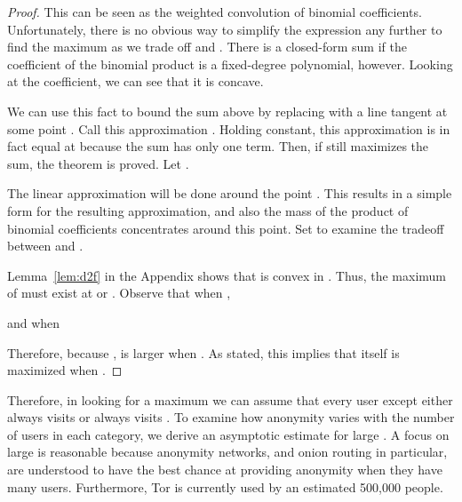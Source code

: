 \documentclass[prodmode,acmtissec]{acmsmall}
\begin{document}
\begin{proof}
This can be seen as the weighted convolution of binomial coefficients.  Unfortunately, there is no obvious way to simplify the expression any further to find the maximum as we trade off  and .  There is a closed-form sum if the coefficient of the binomial product is a fixed-degree polynomial, however.  Looking at the coefficient, we can see that it is concave.


We can use this fact to bound the sum above by replacing  with a line tangent at some point .  Call this approximation .  Holding  constant, this approximation is in fact equal at  because the sum has only one term.  Then, if  still maximizes the sum, the theorem is proved.  Let .



The linear approximation will be done around the point .  This results in a simple form for the resulting approximation, and also the mass of the product of binomial coefficients concentrates around this point.  Set  to examine the tradeoff between  and .



Lemma~\ref{lem:d2f} in the Appendix shows that  is convex in .  Thus, the maximum of  must exist at  or .  Observe that when ,

and when 

Therefore, because ,  is larger when .  As stated, this implies that  itself is maximized when .\hfill

\end{proof}

Therefore, in looking for a maximum we can assume that every user except  either always visits  or always visits .  To examine how anonymity varies with the number of users in each category, we derive an asymptotic estimate for large .  A focus on large  is reasonable because anonymity networks, and onion routing in particular, are understood to have the best chance at providing anonymity when they have many users.  Furthermore, Tor is currently used by an estimated 500,000 people.
\end{document}
